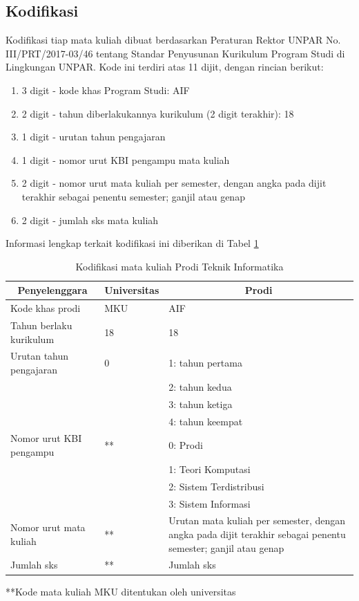 \subsection{Kodifikasi}

Kodifikasi tiap mata kuliah dibuat berdasarkan Peraturan Rektor UNPAR No. III/PRT/2017-03/46 tentang Standar Penyusunan Kurikulum Program Studi di Lingkungan UNPAR. Kode ini terdiri atas 11 dijit, dengan rincian berikut:
\begin{enumerate}
	\item 3 digit - kode khas Program Studi: AIF
	\item 2 digit - tahun diberlakukannya kurikulum (2 digit terakhir): 18
	\item 1 digit - urutan tahun pengajaran
	\item 1 digit - nomor urut KBI pengampu mata kuliah
	\item 2 digit - nomor urut mata kuliah per semester, dengan angka pada dijit terakhir sebagai penentu semester; ganjil atau genap
	\item 2 digit - jumlah sks mata kuliah
\end{enumerate}
Informasi lengkap terkait kodifikasi ini diberikan di Tabel \ref{tab:2_kodifikasi_matakuliah}
\begin{table}[H]
	\centering
	\caption{Kodifikasi mata kuliah Prodi Teknik Informatika}
    \begin{tabular}{|p{4.75cm}|p{3.5cm}|p{5.25cm}|}
		\hline
		\multicolumn{1}{|c}{\textbf{Penyelenggara}} & \multicolumn{1}{|c|}{\textbf{Universitas}} & \multicolumn{1}{c|}{\textbf{Prodi}}\\
		\hline
    Kode khas prodi & MKU & AIF \\
		\hline
		Tahun berlaku kurikulum & 18 & 18 \\
		\hline
		Urutan tahun pengajaran & 0 & 1: tahun pertama \\
		                        &   & 2: tahun kedua \\
		                        &   & 3: tahun ketiga \\
		                        &   & 4: tahun keempat \\
		\hline
		Nomor urut KBI pengampu & ** & 0: Prodi \\
		                        &   & 1: Teori Komputasi \\
		                        &   & 2: Sistem Terdistribusi \\
		                        &   & 3: Sistem Informasi \\
		\hline
		Nomor urut mata kuliah & ** & Urutan mata kuliah per semester, dengan angka pada dijit terakhir sebagai penentu semester; ganjil atau genap\\
		\hline
		Jumlah sks & ** & Jumlah sks\\
		\hline
    \end{tabular}
	\label{tab:2_kodifikasi_matakuliah}
\end{table}
**Kode mata kuliah MKU ditentukan oleh universitas

